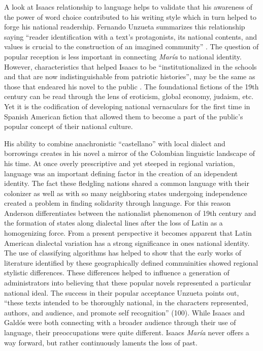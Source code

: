 \documentclass[12pt]{report}\usepackage[]{graphicx}\usepackage[]{color}
\begin{document}
\begin{spacing}{1.9}
A look at Isaacs relationship to language helps to validate that his awareness of the power of word choice contributed to his writing style which in turn helped to forge his national readership.
Fernando Unzueta summarizes this relationship saying \enquote{reader identification with a text's protagonists, its national contents, and values is crucial to the construction of an imagined community} \autocite[82]{Unzueta2002}.
The question of popular reception is less important in connecting \textit{María} to national identity.
However, characteristics that helped Isaacs to be \enquote{institutionalized in the schools and that are now indistinguishable from patriotic histories}, may be the same as those that endeared his novel to the public \autocite[add. text]{Sommer1991}.
The foundational fictions of the 19th century can be read through the lens of eroticism, global economy, judaism, etc.
Yet it is the codification of developing national vernaculars for the first time in Spanish American fiction that allowed them to become a part of the public's popular concept of their national culture. 


His ability to combine anachronistic \enquote{castellano} with local dialect and borrowings creates in his novel a mirror of the Colombian linguistic landscape of his time.
At once overly prescriptive and yet steeped in regional variation, language was an important defining factor in the creation of an idependent identity.
The fact these fledgling nations shared a common language with their colonizer as well as with so many neighboring states undergoing independence created a problem in finding solidarity through language.
For this reason Anderson differentiates between the nationalist phenomenon of 19th century and the formation of states along dialectal lines after the loss of Latin as a homogenizing force. 
From a present perspective it becomes apparent that Latin American dialectal variation has a strong significance in ones national identity.
The use of classifying algorithms has helped to show that the early works of literature identified by these geographically defined commuinities showed regional stylistic differences. 
These differences helped to influence a generation of administrators into believing that these popular novels represented a particular national ideal.
The success in their popular acceptance Unzueta points out, \enquote{these texts intended to be thoroughly national, in the characters represented, authors, and audience, and promote self recognition} (100). 
While Isaacs and Galdós were both connecting with a broader audience through their use of language, their preoccupations were quite different.
Isaacs \textit{María} never offers a way forward, but rather continuously laments the loss of past.



\end{spacing}
\end{document}
